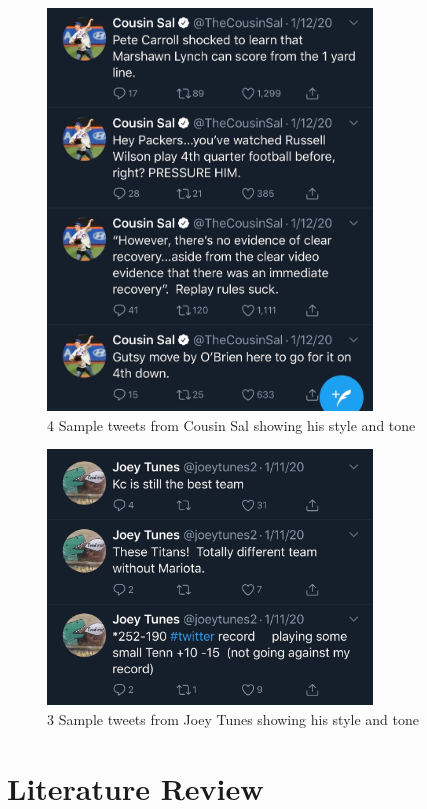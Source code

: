 \documentclass[5p,authoryear]{elsarticle}
\begin{document}
\begin{figure}[!htb] \centering
	\includegraphics[width=3.4in]{figures/CousinSal_Tweet.jpg}
	\caption[]{4 Sample tweets from Cousin Sal showing his style and tone} 
	\label{cousin} 
\end{figure}



\begin{figure}[!htb] \centering
	\includegraphics[width=3.4in]{figures/JoeyTunes_Tweet.jpg}
	\caption[]{3 Sample tweets from Joey Tunes showing his style and tone} 
	\label{joey} 
\end{figure}



\section{Literature Review} \label{lit_rev}
\end{document}
